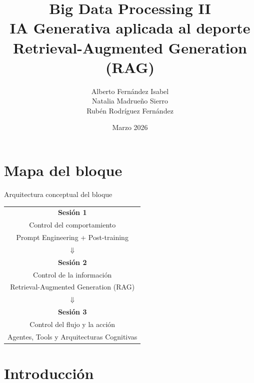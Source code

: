 \documentclass[aspectratio=169]{beamer}
\institute[URJC]{DSLAB}
\author[Big Data Processing II]{
	Alberto Fernández Isabel \\
	Natalia Madrueño Sierro \\
	Rubén Rodríguez Fernández \\
}
\title[Presentación]{
	Big Data Processing II \\ \vspace{0.2em}
	IA Generativa aplicada al deporte \\ \vspace{0.2em}
    Retrieval-Augmented Generation (RAG)
}
\date{Marzo 2026}
\begin{document}
\begin{frame}
\titlepage
\end{frame}

\section{Mapa del bloque}
\frame{\sectionpage}

\begin{frame}{Arquitectura conceptual del bloque}
\begin{center}
\Large
\begin{tabular}{c}
{\color{gray2}\textbf{Sesión 1}} \\ 
{\color{gray2}Control del comportamiento} \\
{\color{gray2}\small Prompt Engineering + Post-training}
\\[0.1em]
$\Downarrow$
\\[0.1em]
{\color{colorblue}\textbf{Sesión 2}} \\ 
{\color{colorblue}Control de la información} \\
{\color{colorblue}\small Retrieval-Augmented Generation (RAG)}
\\[0.1em]
$\Downarrow$
\\[0.1em]
{\color{gray2}\textbf{Sesión 3}} \\ 
{\color{gray2}Control del flujo y la acción} \\
{\color{gray2}\small Agentes, Tools y Arquitecturas Cognitivas}
\end{tabular}
\end{center}
\end{frame}

\section{Introducción}
\frame{\sectionpage}
\end{document}
